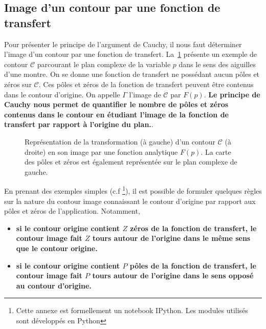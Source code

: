 \subsection{Image d'un contour par une fonction de transfert}
Pour présenter le principe de l'argument de Cauchy, il nous faut déterminer
l'image d'un contour par une fonction de transfert. 
La~\cref{fig-contour_cauchy} présente un exemple de contour $\mathcal{C}$ 
parcourant le plan complexe de la variable $p$ dans le sens des aiguilles 
d'une montre. On se donne une fonction de transfert ne possédant aucun pôles 
et zéros sur $\mathcal{C}$. 
Ces pôles et zéros de la fonction de transfert peuvent être contenus dans le 
contour d'origine. On appelle $\Gamma$ l'image de $\mathcal{C}$ par $F(p)$. 
\textbf{Le principe de Cauchy nous permet de quantifier le nombre de pôles et 
zéros contenus dans le contour en étudiant l'image de la fonction de transfert 
par rapport à l'origine du plan.}.
\begin{figure}[!h]
    \centering
    
    \caption{Représentation de la transformation (à gauche) d'un contour 
             $\mathcal{C}$ (à droite) en son image par une fonction analytique 
             $F(p)$. La carte des pôles et zéros est également représentée 
             sur le plan complexe de gauche.
    \label{fig-contour_cauchy}}
\end{figure}

En prenant des exemples simples (c.f \footnote{Cette 
annexe est formellement un notebook IPython. Les modules utilisés sont 
développés en Python}), il est possible de formuler quelques règles sur la 
nature du contour image connaissant le contour d'origine par rapport aux
pôles et zéros de l'application. Notamment,
\begin{itemize}
    \item \textbf{si le contour origine contient $Z$ zéros de la fonction de 
          transfert, le contour image fait $Z$ tours autour de l'origine dans 
          le même sens que le contour origine.}
    \item \textbf{si le contour origine contient $P$ pôles de la fonction de 
          transfert, le contour image fait $P$ tours autour de l'origine dans 
          le sens opposé au contour d'origine.}
\end{itemize}
\clearpage
{}
\captionsetup{width=0.9\linewidth}
